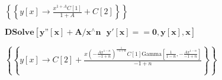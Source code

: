 \documentclass{article}
\begin{document}
\begin{doublespace}
\noindent\(\left\{\left\{y[x]\to \frac{x^{1+A} C[1]}{1+A}+C[2]\right\}\right\}\)
\end{doublespace}

\begin{doublespace}
\noindent\(\pmb{\text{DSolve}[y\text{''}[x]+A/x{}^{\wedge}n\text{  }y'[x]==0,y[x],x]}\)
\end{doublespace}

\begin{doublespace}
\noindent\(\left\{\left\{y[x]\to C[2]+\frac{x \left(-\frac{A x^{1-n}}{-1+n}\right)^{\frac{1}{-1+n}} C[1] \text{Gamma}\left[\frac{1}{1-n},-\frac{A
x^{1-n}}{-1+n}\right]}{-1+n}\right\}\right\}\)
\end{doublespace}
\end{document}
